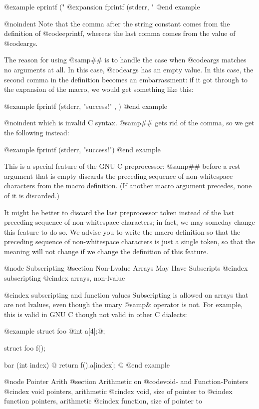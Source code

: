 {@example
eprintf ("%
@expansion{}
fprintf (stderr, "%
@end example

@noindent
Note that the comma after the string constant comes from the definition
of @code{eprintf}, whereas the last comma comes from the value of
@code{args}.

The reason for using @samp{##} is to handle the case when @code{args}
matches no arguments at all.  In this case, @code{args} has an empty
value.  In this case, the second comma in the definition becomes an
embarrassment: if it got through to the expansion of the macro, we would
get something like this:

@example
fprintf (stderr, "success!\n" , )
@end example

@noindent
which is invalid C syntax.  @samp{##} gets rid of the comma, so we get
the following instead:

@example
fprintf (stderr, "success!\n")
@end example

This is a special feature of the GNU C preprocessor: @samp{##} before a
rest argument that is empty discards the preceding sequence of
non-whitespace characters from the macro definition.  (If another macro
argument precedes, none of it is discarded.)

It might be better to discard the last preprocessor token instead of the
last preceding sequence of non-whitespace characters; in fact, we may
someday change this feature to do so.  We advise you to write the macro
definition so that the preceding sequence of non-whitespace characters
is just a single token, so that the meaning will not change if we change
the definition of this feature.

@node Subscripting
@section Non-Lvalue Arrays May Have Subscripts
@cindex subscripting
@cindex arrays, non-lvalue

@cindex subscripting and function values
Subscripting is allowed on arrays that are not lvalues, even though the
unary @samp{&} operator is not.  For example, this is valid in GNU C though
not valid in other C dialects:

@example
struct foo @{int a[4];@};

struct foo f();

bar (int index)
@{
  return f().a[index];
@}
@end example

@node Pointer Arith
@section Arithmetic on @code{void}- and Function-Pointers
@cindex void pointers, arithmetic
@cindex void, size of pointer to
@cindex function pointers, arithmetic
@cindex function, size of pointer to

}
